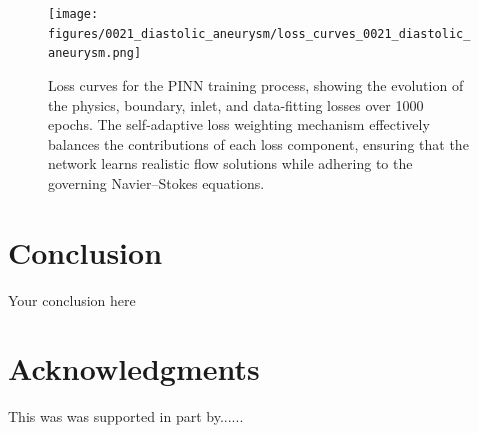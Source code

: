 \documentclass{article}
\begin{document}
\begin{figure}[H]
    \centering
    \scriptsize
    \texttt{[image: figures/0021\_diastolic\_aneurysm/loss\_curves\_0021\_diastolic\_aneurysm.png]}
    \caption{Loss curves for the PINN training process, showing the evolution of the physics, boundary, inlet, and data-fitting losses over 1000 epochs. The self-adaptive loss weighting mechanism effectively balances the contributions of each loss component, ensuring that the network learns realistic flow solutions while adhering to the governing Navier--Stokes equations.}
    \label{fig:loss_curves1}
\end{figure}


\section{Conclusion}
Your conclusion here

\section*{Acknowledgments}
This was was supported in part by......

  
  
\end{document}
